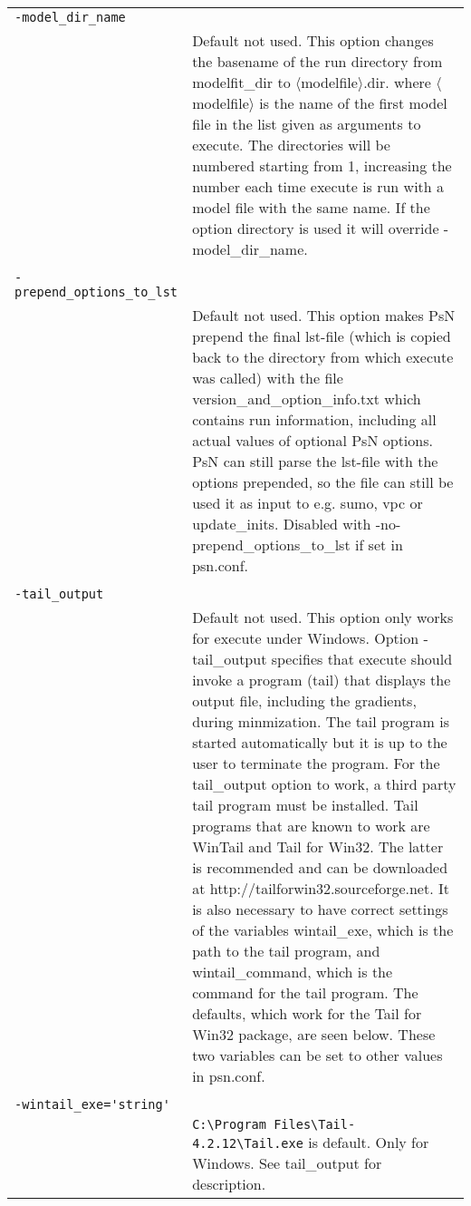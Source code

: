 \documentclass[a4paper,12pt]{article}
\begin{document}
\begin{longtable}{p{1in}p{4in}}
\verb|-model_dir_name| & \\
\nopagebreak
 & Default not used. This option changes the basename of the run directory from modelfit\_dir to $\langle$modelfile$\rangle$.dir. where $\langle$modelfile$\rangle$ is the name of the first model file in the list given as arguments to execute. The directories will be numbered starting from 1, increasing the number each time execute is run with a model file with the same name. If the option directory is used it will override -model\_dir\_name.\\
\\
\verb|-prepend_options_to_lst| & \\
\nopagebreak
 & Default not used. This option makes PsN prepend the final lst-file (which is copied back to the directory from which execute was called) with the file version\_and\_option\_info.txt which contains run information, including     all actual values of optional PsN options. PsN can still parse the lst-file with the options prepended, so the file can still be used it as input to e.g. sumo, vpc or update\_inits. Disabled with -no-prepend\_options\_to\_lst if set in psn.conf.\\
\\
\verb|-tail_output| & \\
\nopagebreak
 & Default not used. This option only works for execute under Windows. Option -tail\_output specifies that execute should invoke a program (tail) that displays the output file, including the gradients, during minmization. The tail program is started automatically but it is up to the user to terminate the program. For the tail\_output option to work, a third party tail program must be installed. Tail programs that are known to work are WinTail and Tail for Win32.  The latter is recommended and can be downloaded at http://tailforwin32.sourceforge.net. It is also necessary to have correct settings of the variables wintail\_exe, which is the path to the tail program, and wintail\_command, which is the command for the tail program. The defaults, which work for the Tail for Win32 package, are seen below. These two variables can be set to other values in psn.conf.\\
\\
\verb|-wintail_exe='string'| & \\
\nopagebreak
 & \verb|C:\Program Files\Tail-4.2.12\Tail.exe| is default. Only for Windows. See tail\_output for description.\\

\end{longtable}
\end{document}
